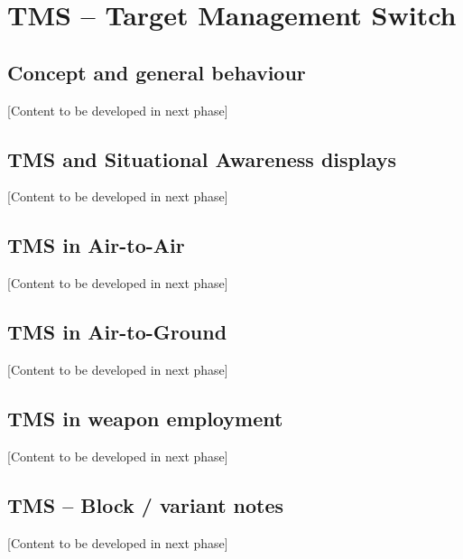 \documentclass[11pt, a4paper, twoside]{report}
\begin{document}
\chapter{TMS -- Target Management Switch}
\label{chap:C4}

\section{Concept and general behaviour}
\label{sec:C4-S1}

[Content to be developed in next phase]

\section{TMS and Situational Awareness displays}
\label{sec:C4-S2}

[Content to be developed in next phase]

\section{TMS in Air-to-Air}
\label{sec:C4-S3}

[Content to be developed in next phase]

\section{TMS in Air-to-Ground}
\label{sec:C4-S4}

[Content to be developed in next phase]

\section{TMS in weapon employment}
\label{sec:C4-S5}

[Content to be developed in next phase]

\section{TMS -- Block / variant notes}
\label{sec:C4-S6}
[Content to be developed in next phase]
\newpage

\end{document}
